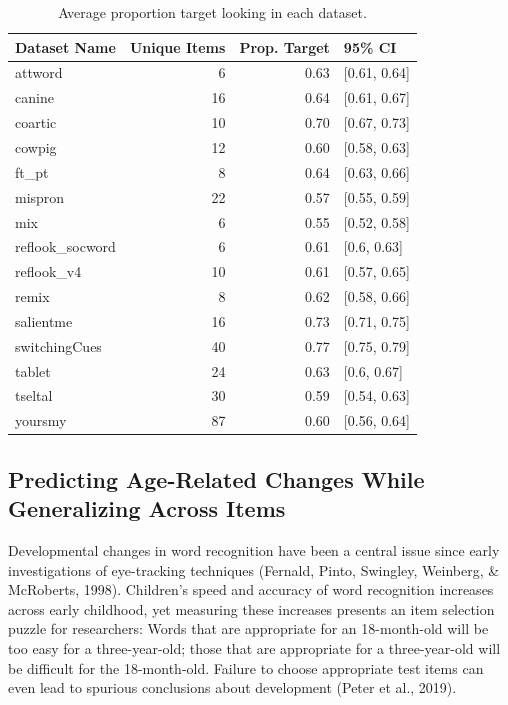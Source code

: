 \documentclass[10pt, letterpaper]{article}
\begin{document}
\begin{table}[H]
\centering
\begingroup\fontsize{9pt}{10pt}\selectfont
\begin{tabular}{lrrl}
  \hline
Dataset Name & Unique Items & Prop. Target & 95\% CI \\ 
  \hline
attword & 6 & 0.63 & [0.61, 0.64] \\ 
  canine & 16 & 0.64 & [0.61, 0.67] \\ 
  coartic & 10 & 0.70 & [0.67, 0.73] \\ 
  cowpig & 12 & 0.60 & [0.58, 0.63] \\ 
  ft\_pt & 8 & 0.64 & [0.63, 0.66] \\ 
  mispron & 22 & 0.57 & [0.55, 0.59] \\ 
  mix & 6 & 0.55 & [0.52, 0.58] \\ 
  reflook\_socword & 6 & 0.61 & [0.6, 0.63] \\ 
  reflook\_v4 & 10 & 0.61 & [0.57, 0.65] \\ 
  remix & 8 & 0.62 & [0.58, 0.66] \\ 
  salientme & 16 & 0.73 & [0.71, 0.75] \\ 
  switchingCues & 40 & 0.77 & [0.75, 0.79] \\ 
  tablet & 24 & 0.63 & [0.6, 0.67] \\ 
  tseltal & 30 & 0.59 & [0.54, 0.63] \\ 
  yoursmy & 87 & 0.60 & [0.56, 0.64] \\ 
   \hline
\end{tabular}
\endgroup
\caption{Average proportion target looking in each dataset.} 
\end{table}

\hypertarget{predicting-age-related-changes-while-generalizing-across-items}{%
\subsection{Predicting Age-Related Changes While Generalizing Across
Items}\label{predicting-age-related-changes-while-generalizing-across-items}}

Developmental changes in word recognition have been a central issue
since early investigations of eye-tracking techniques (Fernald, Pinto,
Swingley, Weinberg, \& McRoberts, 1998). Children's speed and accuracy
of word recognition increases across early childhood, yet measuring
these increases presents an item selection puzzle for researchers: Words
that are appropriate for an 18-month-old will be too easy for a
three-year-old; those that are appropriate for a three-year-old will be
difficult for the 18-month-old. Failure to choose appropriate test items
can even lead to spurious conclusions about development (Peter et al.,
2019).
\end{document}

